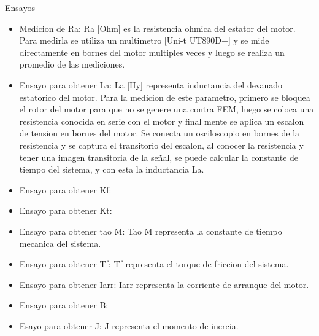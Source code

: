     {\LARGE Ensayos}

    \begin{itemize}
        \item Medicion de Ra:
        Ra [Ohm] es la resistencia ohmica del estator del motor. Para medirla se utiliza un multimetro [Uni-t UT890D+] y se mide directamente en bornes del motor multiples veces y luego se realiza un promedio de las mediciones.

        \item Ensayo para obtener La:
        La [Hy] representa inductancia del devanado estatorico del motor. Para la medicion de este parametro, primero se bloquea el rotor del motor para que no se genere una contra FEM, luego se coloca una resistencia conocida en serie con el motor y final mente se aplica un escalon de tension en bornes del motor. Se conecta un osciloscopio en bornes de la resistencia y se captura el transitorio del escalon, al conocer la resistencia y tener una imagen transitoria de la señal, se puede calcular la constante de tiempo del sistema, y con esta la inductancia La.

        \item Ensayo para obtener Kf:
        
        \item Ensayo para obtener Kt:
        
        \item Ensayo para obtener tao M:
        Tao M representa la constante de tiempo mecanica del sistema.
        
        \item Ensayo para obtener Tf:
        Tf representa el torque de friccion del sistema.
        
        \item Ensayo para obtener Iarr:
        Iarr representa la corriente de arranque del motor.
        
        \item Ensayo para obtener B:
        
        \item Esayo para obtener J: 
        J representa el momento de inercia.
        
        
    \end{itemize}

